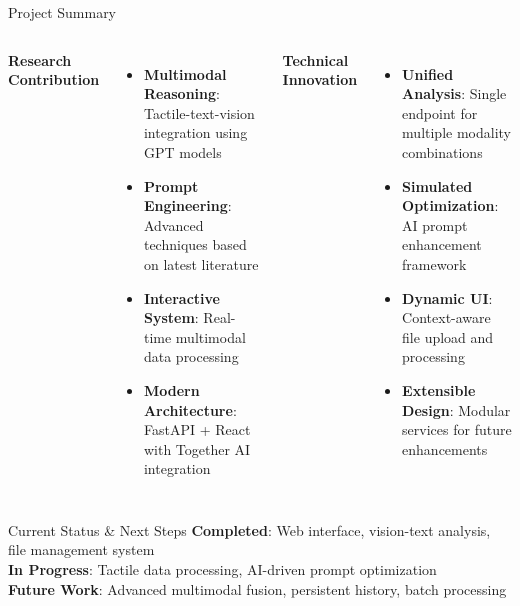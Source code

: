 \documentclass[aspectratio=169,xcolor=dvipsnames]{beamer}
\begin{document}
\begin{frame}{Project Summary}
    \begin{columns}[c]
        \textbf{Research Contribution}
        \begin{itemize}
            \item \textbf{Multimodal Reasoning}: Tactile-text-vision integration using GPT models
            \item \textbf{Prompt Engineering}: Advanced techniques based on latest literature
            \item \textbf{Interactive System}: Real-time multimodal data processing
            \item \textbf{Modern Architecture}: FastAPI + React with Together AI integration
        \end{itemize}

        \textbf{Technical Innovation}
        \begin{itemize}
            \item \textbf{Unified Analysis}: Single endpoint for multiple modality combinations
            \item \textbf{Simulated Optimization}: AI prompt enhancement framework
            \item \textbf{Dynamic UI}: Context-aware file upload and processing
            \item \textbf{Extensible Design}: Modular services for future enhancements
        \end{itemize}
    \end{columns}
    
    \vspace{0.3cm}
    \begin{block}{Current Status \& Next Steps}
        \small
        \textbf{Completed}: Web interface, vision-text analysis, file management system \\
        \textbf{In Progress}: Tactile data processing, AI-driven prompt optimization \\
        \textbf{Future Work}: Advanced multimodal fusion, persistent history, batch processing
    \end{block}
\end{frame}

\end{document}

